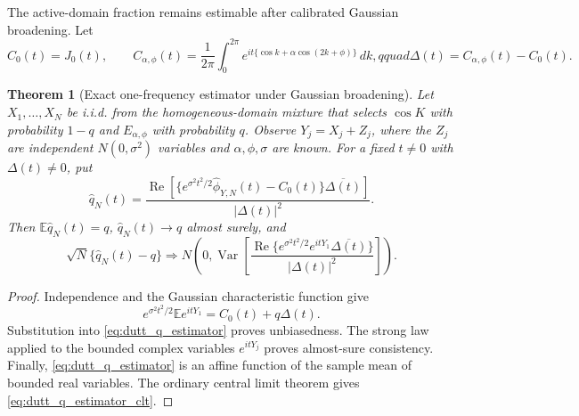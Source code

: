 \documentclass[11pt]{amsart}
\numberwithin{equation}{section}\setcounter{tocdepth}{3}\setcounter{secnumdepth}{3}
\newtheorem{theorem}{Theorem}[section]\newtheorem{proposition}[theorem]{Proposition}
\begin{document}
The active-domain fraction remains estimable after calibrated Gaussian broadening.
Let
\begin{equation}
 C_0(t)=J_0(t),\qquad
 C_{\alpha,\phi}(t)=\frac1{2\pi}\int_0^{2\pi}
 e^{it\{\cos k+\alpha\cos(2k+\phi)\}}\,dk,qquad
 \Delta(t)=C_{\alpha,\phi}(t)-C_0(t).
 \label{eq:dutt_active_inactive_cf}
\end{equation}
\begin{theorem}[Exact one-frequency estimator under Gaussian broadening]
\label{thm:dutt_q_estimator}
Let $X_1,\ldots,X_N$ be i.i.d. from the homogeneous-domain mixture that selects
$\cos K$ with probability $1-q$ and $E_{\alpha,\phi}$ with probability $q$.  Observe
$Y_j=X_j+Z_j$, where the $Z_j$ are independent $N(0,\sigma^2)$ variables and
$\alpha,\phi,\sigma$ are known.  For a fixed $t\ne0$ with $\Delta(t)\ne0$, put
\begin{equation}
 \widehat q_N(t)=
 \frac{\operatorname{Re}\!\left[
 \{e^{\sigma^2t^2/2}\widehat\phi_{Y,N}(t)-C_0(t)\}
 \overline{\Delta(t)}\right]}{|\Delta(t)|^2}.
 \label{eq:dutt_q_estimator}
\end{equation}
Then $\mathbb E\widehat q_N(t)=q$, $\widehat q_N(t)\to q$ almost surely, and
\begin{equation}
 \sqrt N\{\widehat q_N(t)-q\}
 \Longrightarrow N\!\left(0,
 \operatorname{Var}\!\left[
 \frac{\operatorname{Re}\{e^{\sigma^2t^2/2}e^{itY_1}
 \overline{\Delta(t)}\}}{|\Delta(t)|^2}\right]\right).
 \label{eq:dutt_q_estimator_clt}
\end{equation}
\end{theorem}
\begin{proof}
Independence and the Gaussian characteristic function give
\begin{equation}
 e^{\sigma^2t^2/2}\mathbb E e^{itY_1}
 =C_0(t)+q\Delta(t).
 \label{eq:dutt_deconvolved_cf_identity}
\end{equation}
Substitution into \eqref{eq:dutt_q_estimator} proves unbiasedness.  The strong law
applied to the bounded complex variables $e^{itY_j}$ proves almost-sure consistency.
Finally, \eqref{eq:dutt_q_estimator} is an affine function of the sample mean of bounded
real variables.  The ordinary central limit theorem gives
\eqref{eq:dutt_q_estimator_clt}.
\end{proof}
\end{document}
